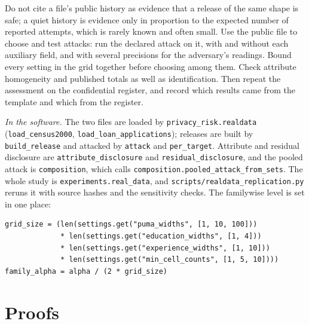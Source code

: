 \begin{inpractice}
Do not cite a file's public history as evidence that a release of the same shape is safe;
a quiet history is evidence only in proportion to the expected number of reported
attempts, which is rarely known and often small. Use the public file to choose and test
attacks: run the declared attack on it, with and without each auxiliary field, and with
several precisions for the adversary's readings. Bound every setting in the grid together
before choosing among them. Check attribute homogeneity and published totals as well as
identification. Then repeat the assessment on the confidential register, and record which
results came from the template and which from the register.

\sloppy\smallskip\noindent\textit{In the software.} The two files are loaded by
\texttt{privacy\_risk.realdata} (\texttt{load\_census2000},
\texttt{load\_loan\_applications}); releases are built by \texttt{build\_release} and
attacked by \texttt{attack} and \texttt{per\_target}. Attribute and residual disclosure are
\texttt{attribute\_disclosure} and \texttt{residual\_disclosure}, and the pooled attack is
\texttt{composition}, which calls \texttt{composition.pooled\_attack\_from\_sets}. The whole
study is \texttt{experiments.real\_data}, and \texttt{scripts/realdata\_replication.py}
reruns it with source hashes and the sensitivity checks. The familywise level is set in
one place:
\begin{lstlisting}
grid_size = (len(settings.get("puma_widths", [1, 10, 100]))
             * len(settings.get("education_widths", [1, 4]))
             * len(settings.get("experience_widths", [1, 10]))
             * len(settings.get("min_cell_counts", [1, 5, 10])))
family_alpha = alpha / (2 * grid_size)
\end{lstlisting}
\end{inpractice}

\section{Proofs}

